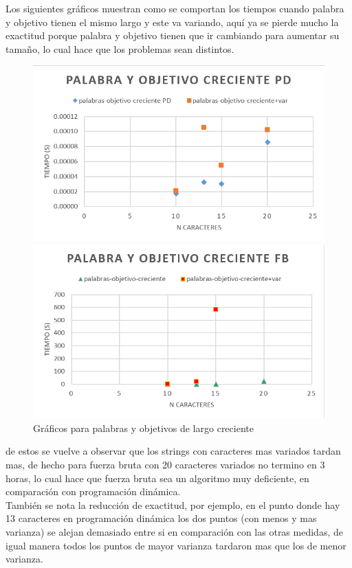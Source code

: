 Los siguientes gráficos muestran como se comportan los tiempos cuando palabra y objetivo tienen el mismo largo y este va variando, aquí ya se pierde mucho la exactitud porque palabra y objetivo tienen que ir cambiando para aumentar su tamaño, lo cual hace que los problemas sean distintos.

\begin{figure}[H]
    \centering
    \begin{minipage}[t]{0.5\textwidth}
        \includegraphics[width=\textwidth]{images/po-credientes-pd.png}
    \end{minipage}%
    \begin{minipage}[t]{0.5\textwidth}
        \includegraphics[width=\textwidth]{images/po-credientes-fb.png}    \end{minipage}%
    \caption{Gráficos para palabras y objetivos de largo creciente}
    \label{fig:POcreciente}
\end{figure} 

de estos se vuelve a observar que los strings con caracteres mas variados tardan mas, de hecho para fuerza bruta con 20 caracteres variados no termino en 3 horas, lo cual hace que fuerza bruta sea un algoritmo muy deficiente, en comparación con programación dinámica.\\
También se nota la reducción de exactitud, por ejemplo, en el punto donde hay 13 caracteres en programación dinámica los dos puntos (con menos y mas varianza) se alejan demasiado entre si en comparación con las otras medidas, de igual manera todos los puntos de mayor varianza tardaron mas que los de menor varianza.

